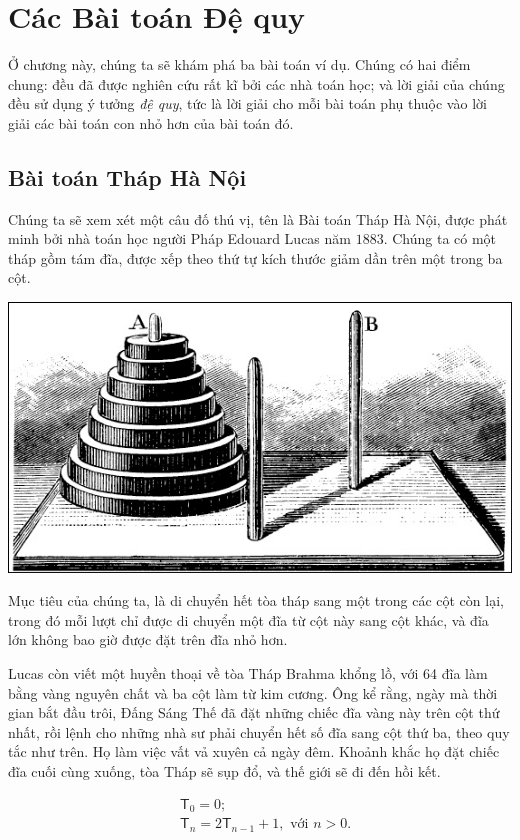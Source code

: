 \chapter{Các Bài toán Đệ quy}\label{ch:recurrent-problems}

Ở chương này, chúng ta sẽ khám phá ba bài toán ví dụ.
Chúng có hai điểm chung:
đều đã được nghiên cứu rất kĩ bởi các nhà toán học;
và lời giải của chúng đều sử dụng ý tưởng \textit{đệ quy}, tức là lời giải cho mỗi bài toán phụ thuộc vào lời giải các bài toán con nhỏ hơn của bài toán đó.

\section{Bài toán Tháp Hà Nội}


Chúng ta sẽ xem xét một câu đố thú vị, tên là Bài toán Tháp Hà Nội, được phát minh bởi nhà toán học người Pháp Edouard Lucas năm $1883$.
Chúng ta có một tháp gồm tám đĩa, được xếp theo thứ tự kích thước giảm dần trên một trong ba cột.

\begin{center}
    \includegraphics[width=.5\textwidth]{assets/chapter1/Tower of Hanoi}
\end{center}

Mục tiêu của chúng ta, là di chuyển hết tòa tháp sang một trong các cột còn lại, trong đó mỗi lượt chỉ được di chuyển một đĩa từ cột này sang cột khác, và đĩa lớn không bao giờ được đặt trên đĩa nhỏ hơn.


Lucas còn viết một huyền thoại về tòa Tháp Brahma khổng lồ, với 64 đĩa làm bằng vàng nguyên chất và ba cột làm từ kim cương.
Ông kể rằng, ngày mà thời gian bắt đầu trôi, Đấng Sáng Thế đã đặt những chiếc đĩa vàng này trên cột thứ nhất, rồi lệnh cho những nhà sư phải chuyển hết số đĩa sang cột thứ ba, theo quy tắc như trên.
Họ làm việc vất vả xuyên cả ngày đêm.
Khoảnh khắc họ đặt chiếc đĩa cuối cùng xuống, tòa Tháp sẽ sụp đổ, và thế giới sẽ đi đến hồi kết.

\begin{equation}\label{eq:1.1}
    \begin{aligned}
        & \mathsf{T}_0 = 0; \\
        & \mathsf{T}_n = 2 \mathsf{T}_{n - 1} + 1, \text{ với } n > 0.
    \end{aligned}
\end{equation}